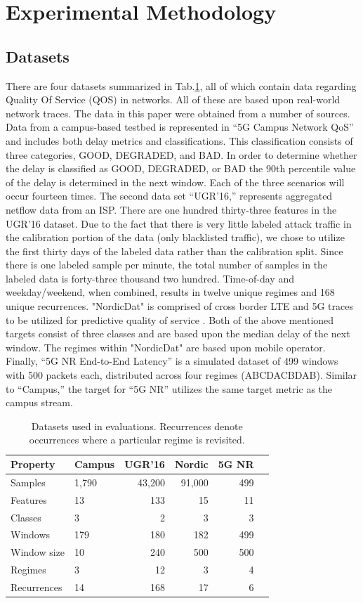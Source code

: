\documentclass[conference]{IEEEtran}
\begin{document}
\section{Experimental Methodology}\label{sec:protocol} 
\subsection{Datasets} 
There are four datasets summarized in Tab.\ref{tab:datasets}, all of which contain data regarding Quality Of Service (QOS) in networks. All of these are based upon real-world network traces. The data in this paper were obtained from a number of sources. Data from a campus-based testbed is represented in “5G Campus Network QoS” and includes both delay metrics and classifications. This classification consists of three categories, GOOD, DEGRADED, and BAD. In order to determine whether the delay is classified as GOOD, DEGRADED, or BAD the 90th percentile value of the delay is determined in the next window. Each of the three scenarios will occur fourteen times. The second data set “UGR’16,” represents aggregated netflow data from an ISP. There are one hundred thirty-three features in the UGR’16 dataset. Due to the fact that there is very little labeled attack traffic in the calibration portion of the data (only blacklisted traffic), we chose to utilize the first thirty days of the labeled data rather than the calibration split. Since there is one labeled sample per minute, the total number of samples in the labeled data is forty-three thousand two hundred. Time-of-day and weekday/weekend, when combined, results in twelve unique regimes and 168 unique recurrences. "NordicDat" is comprised of cross border LTE and 5G traces to be utilized for predictive quality of service \cite{nordicdat}. Both of the above mentioned targets consist of three classes and are based upon the median delay of the next window. The regimes within "NordicDat" are based upon mobile operator. Finally, “5G NR End-to-End Latency” is a simulated dataset \cite{nrlatency} of 499 windows with 500 packets each, distributed across four regimes (ABCDACBDAB). Similar to “Campus,” the target for “5G NR” utilizes the same target metric as the campus stream.


\begin{table}[hbt!] 
\small 
\caption{Datasets used in evaluations. Recurrences denote occurrences where a particular regime is revisited.} 
\label{tab:datasets} 
\centering 
\begin{tabular}{@{}llrrrr@{}}
\toprule
\textbf{Property} & \textbf{Campus} & \textbf{UGR'16} & \textbf{Nordic} & \textbf{5G NR}\\
\midrule
Samples & 1,790 & 43,200 & 91,000 & 499\\
Features & 13 & 133 & 15 & 11\\
Classes & 3 & 2 & 3 & 3\\
Windows & 179 & 180 & 182 & 499\\
Window size & 10 & 240 & 500 & 500\\
Regimes & 3 & 12 & 3 & 4\\
Recurrences & 14 & 168 & 17 & 6\\
\bottomrule
\end{tabular} 
\end{table}
\end{document}
